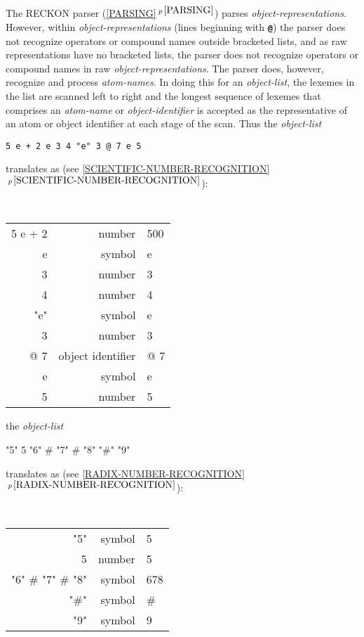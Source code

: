 \documentclass[12pt]{article}
\newcommand{\TT}[1]{{\tt \bfseries #1}}
\newcommand{\secref}[1]{\ref{#1}$\,^{p\,\pageref{#1}}$}
\begin{document}
The RECKON parser (\secref{PARSING}) parses {\em object-representations}.
However, within {\em object-representa\-tions} (lines beginning with \TT{@})
the parser does not recognize operators or compound names
outside bracketed lists, and as
raw representations have no bracketed lists, the parser does not recognize
operators or compound names in raw {\em object-representations}.%
\label{RAW-PARSING}
The parser does, however,
recognize and process {\em atom-names}.
In doing this for an {\em object-list}, the lexemes in the list are scanned
left to right and the longest sequence of lexemes that comprises an
{\em atom-name} or {\em object-identifier}
is accepted as the representative of an atom or object identifier at
each stage of the scan.
Thus the {\em object-list}
\begin{center}
\tt 5 e + 2 e 3 4 "e" 3 @ 7 e 5
\end{center}
translates as (see \secref{SCIENTIFIC-NUMBER-RECOGNITION}):
\begin{center}
\tt
\begin{tabular}{r@{~~$\Longrightarrow$~~}rl}
5 e + 2 & \rm number & 500 \\
e	& \rm symbol & e \\
3	& \rm number & 3 \\
4	& \rm number & 4 \\
"e"	& \rm symbol & e \\
3	& \rm number & 3 \\
@ 7	& \rm object identifier & @ 7 \\
e	& \rm symbol & e \\
5	& \rm number & 5 \\
\end{tabular}
\end{center}

the {\em object-list}

\begin{center}
"5" 5 "6" \# "7" \# "8" "\#" "9"
\end{center}
translates as (see \secref{RADIX-NUMBER-RECOGNITION}):
\begin{center}
\tt
\begin{tabular}{r@{~~$\Longrightarrow$~~}rl}

"5"			& \rm symbol & 5 \\
5			& \rm number & 5 \\
"6" \# "7" \# "8"	& \rm symbol & 678 \\
"\#"			& \rm symbol & \# \\
"9"			& \rm symbol & 9 \\
\end{tabular}
\end{center}
\end{document}
